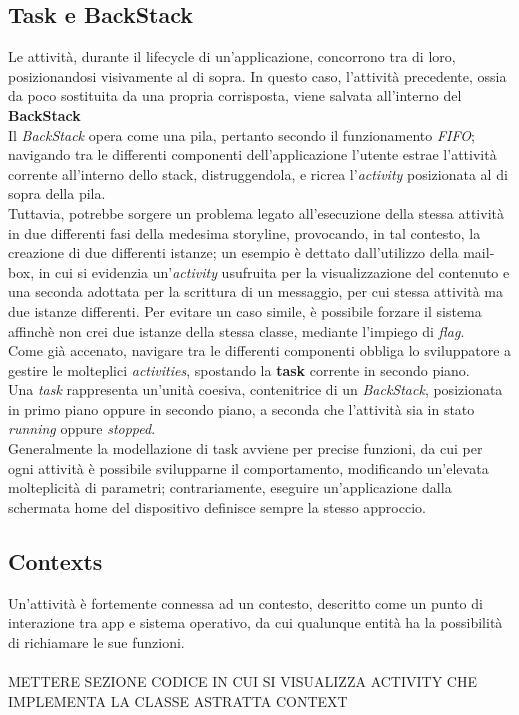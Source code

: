 \documentclass{article}
\begin{document}
\subsection*{Task e BackStack}
Le attività, durante il lifecycle di un'applicazione, concorrono tra di loro, posizionandosi visivamente al di sopra. In questo caso, l'attività precedente, ossia da poco sostituita da una propria corrisposta, viene salvata all'interno del \textbf{BackStack}\vspace*{7pt}\\
Il \textit{BackStack} opera come una pila, pertanto secondo il funzionamento \textit{FIFO}; navigando tra le differenti componenti dell'applicazione l'utente estrae l'attività corrente all'interno dello stack, distruggendola, e ricrea l'\textit{activity} posizionata al di sopra della pila.\vspace*{7pt}\\
Tuttavia, potrebbe sorgere un problema legato all'esecuzione della stessa attività in due differenti fasi della medesima storyline, provocando, in tal contesto, la creazione di due differenti istanze; un esempio è dettato dall'utilizzo della mail-box, in cui si evidenzia un'\textit{activity} usufruita per la visualizzazione del contenuto e una seconda adottata per la scrittura di un messaggio, per cui stessa attività ma due istanze differenti. Per evitare un caso simile, è possibile forzare il sistema affinchè non crei due istanze della stessa classe, mediante l'impiego di \textit{flag}.\vspace*{14pt}\\
Come già accenato, navigare tra le differenti componenti obbliga lo sviluppatore a gestire le molteplici \textit{activities}, spostando la \textbf{task} corrente in secondo piano.\\
Una \textit{task} rappresenta un'unità coesiva, contenitrice di un \textit{BackStack}, posizionata in primo piano oppure in secondo piano, a seconda che l'attività sia in stato \textit{running} oppure \textit{stopped}.\vspace*{7pt}\\
Generalmente la modellazione di task avviene per precise funzioni, da cui per ogni attività è possibile svilupparne il comportamento, modificando un'elevata molteplicità di parametri; contrariamente, eseguire un'applicazione dalla schermata home del dispositivo definisce sempre la stesso approccio.

\subsection*{Contexts}
Un'attività è fortemente connessa ad un contesto, descritto come un punto di interazione tra app e sistema operativo, da cui qualunque entità ha la possibilità di richiamare le sue funzioni.\\
\\ METTERE SEZIONE CODICE IN CUI SI VISUALIZZA ACTIVITY CHE IMPLEMENTA LA CLASSE ASTRATTA CONTEXT 
\end{document}

